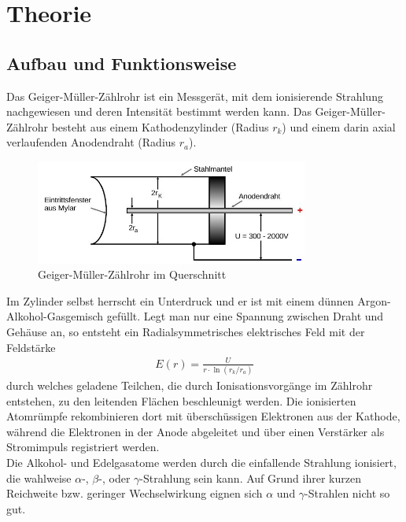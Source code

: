 
\section{Theorie}
\subsection{Aufbau und Funktionsweise}
Das Geiger-Müller-Zählrohr ist ein Messgerät, mit dem ionisierende Strahlung nachgewiesen und deren Intensität bestimmt werden kann. Das Geiger-Müller-Zählrohr besteht aus einem Kathodenzylinder (Radius $r_k$) und einem darin axial verlaufenden Anodendraht (Radius $r_a$).
\begin{figure}[htbp]
\includegraphics[width=0.8\textwidth]{pics/zaehlrohr.jpg}
\caption{Geiger-Müller-Zählrohr im Querschnitt}
\end{figure}
Im Zylinder selbst herrscht ein Unterdruck und er ist mit einem dünnen Argon-Alkohol-Gasgemisch gefüllt. Legt man nur eine Spannung zwischen Draht und Gehäuse an, so entsteht ein Radialsymmetrisches elektrisches Feld mit der Feldstärke
\begin{align}
E(r)= \frac{U}{r\cdot \ln (r_k / r_a)}
\label{eq_efeld}
\end{align}
durch welches geladene Teilchen, die durch Ionisationsvorgänge im Zählrohr entstehen, zu den leitenden Flächen beschleunigt werden. Die ionisierten Atomrümpfe rekombinieren dort mit überschüssigen Elektronen aus der Kathode, während die Elektronen in der Anode abgeleitet und über einen Verstärker als Stromimpuls registriert werden.\\

Die Alkohol- und Edelgasatome werden durch die einfallende Strahlung ionisiert, die wahlweise $\alpha$-, $\beta$-, oder $\gamma$-Strahlung sein kann. Auf Grund ihrer kurzen Reichweite bzw. geringer Wechselwirkung eignen sich $\alpha \text{ und } \gamma$-Strahlen nicht so gut.

